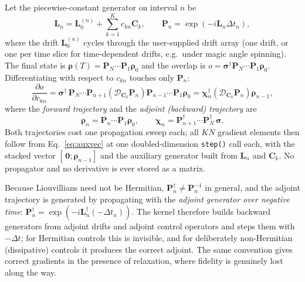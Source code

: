 \documentclass[11pt,a4paper]{article}
\newcommand{\code}[1]{\texttt{#1}}
\begin{document}
Let the piecewise-constant generator on interval $n$ be
\begin{equation}
  \mathbf{L}_n=\mathbf{L}_0^{(n)}+\sum_{k=1}^{K}c_{kn}\mathbf{C}_k,
  \qquad
  \mathbf{P}_n=\exp(-i\mathbf{L}_n\Delta t_n),
\end{equation}
where the drift $\mathbf{L}_0^{(n)}$ cycles through the user-supplied
drift array (one drift, or one per time slice for time-dependent drifts,
e.g.\ under magic angle spinning). The final state is
$\boldsymbol{\rho}(T)=\mathbf{P}_N\cdots\mathbf{P}_1\boldsymbol{\rho}_0$
and the overlap is
$o=\boldsymbol{\sigma}^{\dagger}\mathbf{P}_N\cdots\mathbf{P}_1
\boldsymbol{\rho}_0$. Differentiating with respect to $c_{kn}$ touches
only $\mathbf{P}_n$:
\begin{equation}
  \frac{\partial o}{\partial c_{kn}}
  =\boldsymbol{\sigma}^{\dagger}\,
   \mathbf{P}_N\cdots\mathbf{P}_{n+1}
   \left(\mathcal{D}_{\mathbf{C}_k}\mathbf{P}_n\right)
   \mathbf{P}_{n-1}\cdots\mathbf{P}_1\boldsymbol{\rho}_0
  =\boldsymbol{\chi}_{n}^{\dagger}
   \left(\mathcal{D}_{\mathbf{C}_k}\mathbf{P}_n\right)
   \boldsymbol{\rho}_{n-1},
  \label{eq:gradliouv}
\end{equation}
where the \emph{forward trajectory} and the \emph{adjoint (backward)
trajectory} are
\begin{equation}
  \boldsymbol{\rho}_{n}=\mathbf{P}_n\cdots\mathbf{P}_1
  \boldsymbol{\rho}_0,
  \qquad
  \boldsymbol{\chi}_{n}
  =\mathbf{P}_{n+1}^{\dagger}\cdots\mathbf{P}_N^{\dagger}\,
  \boldsymbol{\sigma}.
  \label{eq:trajectories}
\end{equation}
Both trajectories cost one propagation sweep each; all $KN$ gradient
elements then follow from Eq.~\eqref{eq:auxvec} at one doubled-dimension
\code{step()} call each, with the stacked vector
$[\,\mathbf{0};\boldsymbol{\rho}_{n-1}]$ and the auxiliary generator
built from $\mathbf{L}_n$ and $\mathbf{C}_k$. No propagator and no
derivative is ever stored as a matrix.

Because Liouvillians need not be Hermitian,
$\mathbf{P}_n^{\dagger}\neq\mathbf{P}_n^{-1}$ in general, and the adjoint
trajectory is generated by propagating with the \emph{adjoint generator
over negative time}:
$\mathbf{P}_n^{\dagger}=\exp(-i\mathbf{L}_n^{\dagger}(-\Delta t_n))$. The
kernel therefore builds backward generators from adjoint drifts and
adjoint control operators and steps them with $-\Delta t$; for Hermitian
controls this is invisible, and for deliberately non-Hermitian
(dissipative) controls it produces the correct adjoint. The same
convention gives correct gradients in the presence of relaxation, where
fidelity is genuinely lost along the way.
\end{document}
